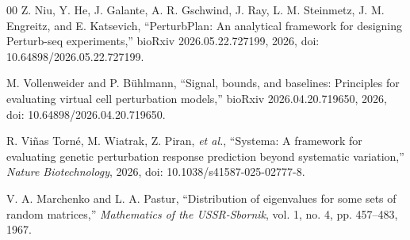 \documentclass[journal,twoside,web]{ieeecolor}
\begin{document}
\begin{thebibliography}{00}
Z. Niu, Y. He, J. Galante, A. R. Gschwind, J. Ray, L. M. Steinmetz,
J. M. Engreitz, and E. Katsevich, ``PerturbPlan: An analytical framework for
designing Perturb-seq experiments,'' bioRxiv 2026.05.22.727199, 2026,
doi: 10.64898/2026.05.22.727199.

M. Vollenweider and P. B\"{u}hlmann, ``Signal, bounds, and baselines:
Principles for evaluating virtual cell perturbation models,'' bioRxiv
2026.04.20.719650, 2026, doi: 10.64898/2026.04.20.719650.

R. Vi\~{n}as Torn\'{e}, M. Wiatrak, Z. Piran, \emph{et al.}, ``Systema: A
framework for evaluating genetic perturbation response prediction beyond
systematic variation,'' \emph{Nature Biotechnology}, 2026,
doi: 10.1038/s41587-025-02777-8.

V. A. Marchenko and L. A. Pastur, ``Distribution of eigenvalues for some sets
of random matrices,'' \emph{Mathematics of the USSR-Sbornik}, vol. 1, no. 4,
pp. 457--483, 1967.

\end{thebibliography}
\end{document}
